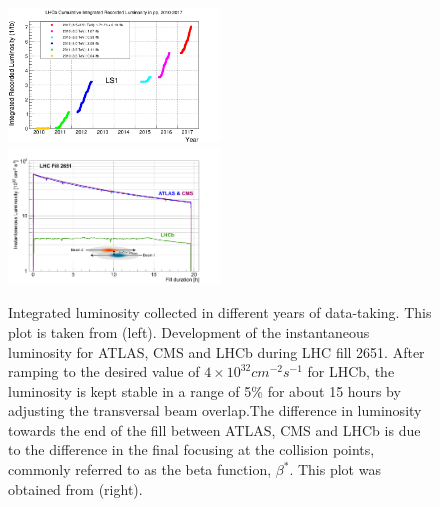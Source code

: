 \begin{figure}
	\centering
	\includegraphics[width = 0.5\textwidth]{figs/detector/intlumi.png}%
        \includegraphics[width = 0.5\textwidth]{figs/detector/lumicompare.png}
	\caption{Integrated luminosity collected in different years of data-taking. This plot is taken from \cite{lumiover} (left). Development of the instantaneous luminosity for \Gls{ATLAS}, \Gls{CMS} and \Gls{LHCb} during LHC fill 2651. After ramping to the desired value of $4\times10^{32}cm^{-2}s^{-1}$
for LHCb, the luminosity is kept stable in a range of 5$\%$ for about 15 hours by adjusting the transversal beam overlap.The difference in luminosity towards the end of the fill between ATLAS, CMS and LHCb is due to the difference in the final focusing at the collision points, commonly referred to as the beta function, $\beta^{*}$. This plot was obtained from \cite{LHCb-DP-2014-002} (right).}
	\label{fig:lhcbintlumi}
\end{figure}


